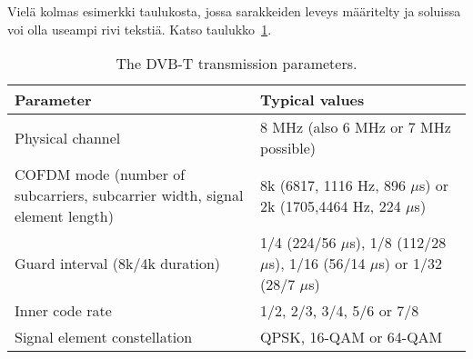 Vielä kolmas esimerkki taulukosta, jossa sarakkeiden leveys määritelty
ja soluissa voi olla useampi rivi tekstiä. Katso
taulukko~\ref{table:dvbt_param}.

\begin{table}[th]
\caption{The DVB-T transmission parameters.}
\label{table:dvbt_param}
\begin{center}
\begin{tabular}{|p{}|p{}|} 
    \hline
Parameter & Typical values \\
    \hline
    \hline
Physical channel&8 MHz (also 6 MHz or 7 MHz possible)\\ 
    \hline
COFDM mode (number of subcarriers, 
subcarrier width, 
signal element length)
&8k (6817, 1116 Hz, 896 $\mu$s) or 
2k (1705,4464 Hz, 224 $\mu$s)\\
    \hline
Guard interval (8k/4k duration)
&1/4 (224/56 $\mu$s), 1/8 (112/28 $\mu$s),
   1/16 (56/14 $\mu$s) or 1/32 (28/7 $\mu$s)\\
    \hline
Inner code rate &1/2, 2/3, 3/4, 5/6 or 7/8\\
    \hline
Signal  element constellation 
&QPSK, 16-QAM or 64-QAM \\
    \hline
\end{tabular}
\end{center}
\end{table}


